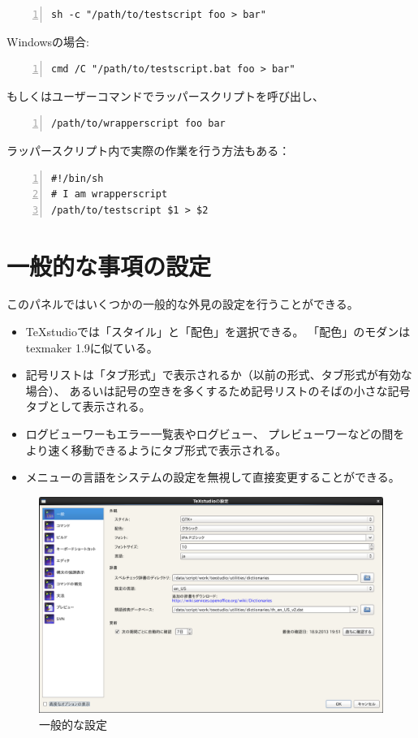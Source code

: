 \begin{lstlisting}[frame=single,breaklines=true,numbers=left]
sh -c "/path/to/testscript foo > bar"
\end{lstlisting}

Windowsの場合:

\begin{lstlisting}[frame=single,breaklines=true,numbers=left]
cmd /C "/path/to/testscript.bat foo > bar"
\end{lstlisting}

もしくはユーザーコマンドでラッパースクリプトを呼び出し、

\begin{lstlisting}[frame=single,breaklines=true,numbers=left]
/path/to/wrapperscript foo bar
\end{lstlisting}

ラッパースクリプト内で実際の作業を行う方法もある：

\begin{lstlisting}[frame=single,breaklines=true,numbers=left]
#!/bin/sh
# I am wrapperscript
/path/to/testscript $1 > $2
\end{lstlisting}

\section{一般的な事項の設定}

このパネルではいくつかの一般的な外見の設定を行うことができる。

\begin{itemize}
\item
  TeXstudioでは「スタイル」と「配色」を選択できる。
  「配色」のモダンはtexmaker 1.9に似ている。
\item
  記号リストは「タブ形式」で表示されるか（以前の形式、タブ形式が有効な場合）、
  あるいは記号の空きを多くするため記号リストのそばの小さな記号タブとして表示される。
\item
  ログビューワーもエラー一覧表やログビュー、
  プレビューワーなどの間をより速く移動できるようにタブ形式で表示される。
\item
  メニューの言語をシステムの設定を無視して直接変更することができる。
\end{itemize}

\begin{figure}[H]
  \centering
  \includegraphics[width=.8\linewidth]{configure_general.png}
  \caption{一般的な設定}
\end{figure}

